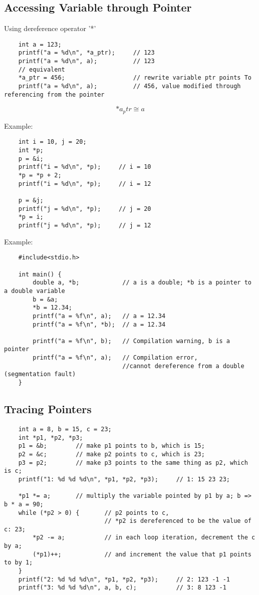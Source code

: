 \documentclass[12pt]{article} %
\begin{document}
\subsection{Accessing Variable through Pointer}
Using dereference operator '*'
\begin{lstlisting}
    int a = 123;
    printf("a = %d\n", *a_ptr);     // 123
    printf("a = %d\n", a);          // 123
    // equivalent 
    *a_ptr = 456;                   // rewrite variable ptr points To
    printf("a = %d\n", a);          // 456, value modified through referencing from the pointer
\end{lstlisting}
\[*a_ptr \cong a\]

Example:
\begin{lstlisting}
    int i = 10, j = 20;
    int *p;
    p = &i;
    printf("i = %d\n", *p);     // i = 10
    *p = *p + 2;
    printf("i = %d\n", *p);     // i = 12
    
    p = &j;
    printf("j = %d\n", *p);     // j = 20
    *p = i;
    printf("j = %d\n", *p);     // j = 12
\end{lstlisting}

Example:
\begin{lstlisting}
    #include<stdio.h>

    int main() {
        double a, *b;            // a is a double; *b is a pointer to a double variable
        b = &a;
        *b = 12.34;
        printf("a = %f\n", a);   // a = 12.34
        printf("a = %f\n", *b);  // a = 12.34

        printf("a = %f\n", b);   // Compilation warning, b is a pointer
        printf("a = %f\n", a);   // Compilation error, 
                                 //cannot dereference from a double (segmentation fault)
    }
\end{lstlisting}

\subsection{Tracing Pointers}
\begin{lstlisting}
    int a = 8, b = 15, c = 23;
    int *p1, *p2, *p3;
    p1 = &b;        // make p1 points to b, which is 15;
    p2 = &c;        // make p2 points to c, which is 23;
    p3 = p2;        // make p3 points to the same thing as p2, which is c;
    printf("1: %d %d %d\n", *p1, *p2, *p3);     // 1: 15 23 23;
    
    *p1 *= a;       // multiply the variable pointed by p1 by a; b => b * a = 90;
    while (*p2 > 0) {       // p2 points to c, 
                            // *p2 is dereferenced to be the value of c: 23;
        *p2 -= a;           // in each loop iteration, decrement the c by a;
        (*p1)++;            // and increment the value that p1 points to by 1;
    }
    printf("2: %d %d %d\n", *p1, *p2, *p3);     // 2: 123 -1 -1
    printf("3: %d %d %d\n", a, b, c);           // 3: 8 123 -1

\end{lstlisting}
\end{document}

